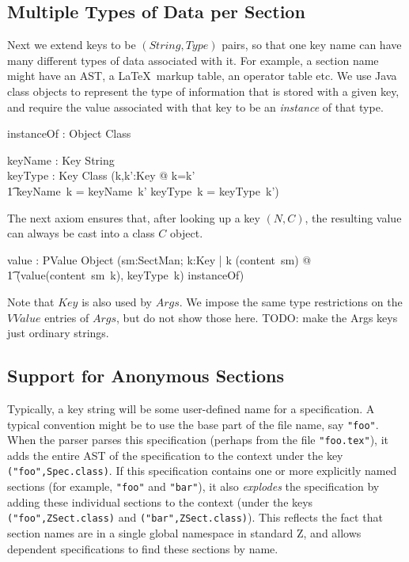 \documentclass{llncs} %
\begin{document}
\subsection{Multiple Types of Data per Section}

Next we extend keys to be $(String,Type)$ pairs, so that
one key name can have many different types of data associated with it.
For example, a section name might have an AST, a \LaTeX\ markup
table, an operator table etc.  We use Java class objects to
represent the type of information that is stored with a given key, 
and require the value associated with that key to be an \emph{instance}
of that type.

\begin{zed}
\end{zed}

\begin{axdef}
  instanceOf : Object \rel Class
\end{axdef}

\begin{axdef}
  keyName : Key \fun String \\
  keyType : Key \fun Class
\where
  (\forall k,k':Key @ k=k' \\
  \t1   \iff keyName~k = keyName~k' \land keyType~k = keyType~k') \\
\end{axdef}

The next axiom ensures that, after looking up a key $(N,C)$,
the resulting value can always be cast into a class $C$ object.
\begin{axdef}
  value : PValue \fun Object  
\where
  (\forall sm:SectMan; k:Key | k \in \dom(content~sm) @ \\
  \t1 (value(content~sm~k), keyType~k) \in instanceOf)
\end{axdef}

Note that $Key$ is also used by $Args$.
We impose the same type restrictions on the $VValue$ entries
of $Args$, but do not show those here.
TODO: make the Args keys just ordinary strings.


\subsection{Support for Anonymous Sections}

Typically, a key string will be some user-defined name for
a specification.  A typical convention might be to use the 
base part of the file name, say \texttt{"foo"}.  
When the parser parses this specification (perhaps from the file
\texttt{"foo.tex"}), it adds the entire AST of the specification
to the context under the key \texttt{("foo",Spec.class)}.
If this specification contains one or more explicitly named sections
(for example, \texttt{"foo"} and \texttt{"bar"}),
it also \emph{explodes} the specification by adding these
individual sections to the context (under the keys
\texttt{("foo",ZSect.class)} and \texttt{("bar",ZSect.class)}).
This reflects the fact that section names are in a single global 
namespace in standard Z, and allows dependent specifications to
find these sections by name.
\end{document}
